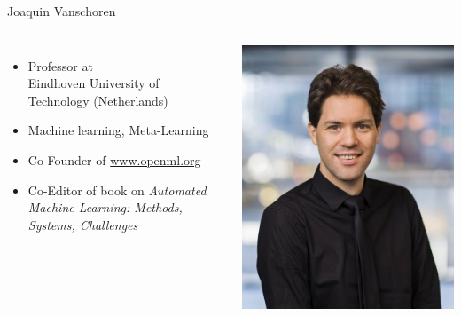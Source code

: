 \begin{frame}[c]{Joaquin Vanschoren}



\begin{columns}


	\begin{itemize}
		\item Professor at\\ Eindhoven University of Technology (Netherlands)
		\item Machine learning, Meta-Learning
		\item Co-Founder of \url{www.openml.org}
    	\item Co-Editor of book on \textit{Automated Machine Learning:	Methods, Systems, Challenges}
	\end{itemize}


	\includegraphics[width=1.0\textwidth]{images/vanschoren.jpg}

\end{columns}


\end{frame}
